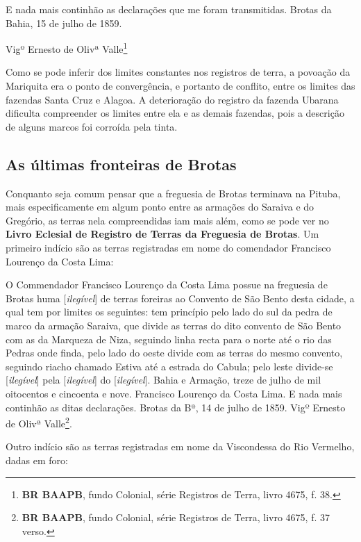 \begin{citacao}
\begin{citacao}
E nada mais continhão as declarações que me foram transmitidas. Brotas da Bahia, 15 de julho de 1859.

Vigº Ernesto de Olivª Valle\footnote{\textbf{BR BAAPB}, fundo Colonial, série Registros de Terra, livro 4675, f. 38.}
\end{citacao}

Como se pode inferir dos limites constantes nos registros de terra, a povoação da Mariquita era o ponto de convergência, e portanto de conflito, entre os limites das fazendas Santa Cruz e Alagoa. A deterioração do registro da fazenda Ubarana dificulta compreender os limites entre ela e as demais fazendas, pois a descrição de alguns marcos foi corroída pela tinta.

\subsection{As últimas fronteiras de Brotas}

Conquanto seja comum pensar que a freguesia de Brotas terminava na Pituba, mais especificamente em algum ponto entre as armações do Saraiva e do Gregório, as terras nela compreendidas iam mais além, como se pode ver no \textbf{Livro Eclesial de Registro de Terras da Freguesia de Brotas}. Um primeiro indício são as terras registradas em nome do comendador Francisco Lourenço da Costa Lima:

\begin{citacao}
O Commendador Francisco Lourenço da Costa Lima possue na freguesia de Brotas huma [\textit{ilegível}] de terras foreiras ao Convento de São Bento desta cidade, a qual tem por limites os seguintes: tem princípio pelo lado do sul da pedra de marco da armação Saraiva, que divide as terras do dito convento de São Bento com as da Marqueza de Niza, seguindo linha recta para o norte até o rio das Pedras onde finda, pelo lado do oeste divide com as terras do mesmo convento, seguindo riacho chamado Estiva até a estrada do Cabula; pelo leste divide-se [\textit{ilegível}] pela [\textit{ilegível}] do [\textit{ilegível}]. Bahia e Armação, treze de julho de mil oitocentos e cincoenta e nove. Francisco Lourenço da Costa Lima. E nada mais continhão as ditas declarações. Brotas da Bª, 14 de julho de 1859. Vigº Ernesto de Olivª Valle\footnote{\textbf{BR BAAPB}, fundo Colonial, série Registros de Terra, livro 4675, f. 37 verso.}.
\end{citacao}

Outro indício são as terras registradas em nome da Viscondessa do Rio Vermelho, dadas em foro:


\end{citacao}
